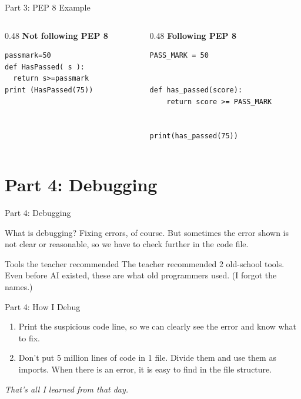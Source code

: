 \documentclass[aspectratio=169,11pt]{beamer}
\begin{document}
\begin{frame}[fragile]{Part 3: PEP 8 Example}
  \begin{columns}[T]
    \begin{column}{0.48\textwidth}
      \textcolor{bad}{\textbf{Not following PEP 8}}
\begin{lstlisting}
passmark=50
def HasPassed( s ):
  return s>=passmark
print (HasPassed(75))
\end{lstlisting}
    \end{column}
    \begin{column}{0.48\textwidth}
      \textcolor{good}{\textbf{Following PEP 8}}
\begin{lstlisting}
PASS_MARK = 50


def has_passed(score):
    return score >= PASS_MARK


print(has_passed(75))
\end{lstlisting}
    \end{column}
  \end{columns}
\end{frame}

\section{Part 4: Debugging}

\begin{frame}{Part 4: Debugging}
  \begin{block}{What is debugging?}
    Fixing errors, of course. But sometimes the error shown is not clear or
    reasonable, so we have to check further in the code file.
  \end{block}
  \begin{block}{Tools the teacher recommended}
    The teacher recommended 2 old-school tools. Even before AI existed, these are
    what old programmers used. (I forgot the names.)
  \end{block}
\end{frame}

\begin{frame}{Part 4: How I Debug}
  \begin{enumerate}\setlength\itemsep{8pt}
    \item Print the suspicious code line, so we can clearly see the error and know
      what to fix.
    \item Don't put 5 million lines of code in 1 file. Divide them and use them as
      imports. When there is an error, it is easy to find in the file structure.
  \end{enumerate}
  \vspace{16pt}
  \begin{center}
    \large\textit{That's all I learned from that day.}
  \end{center}
\end{frame}
\end{document}

